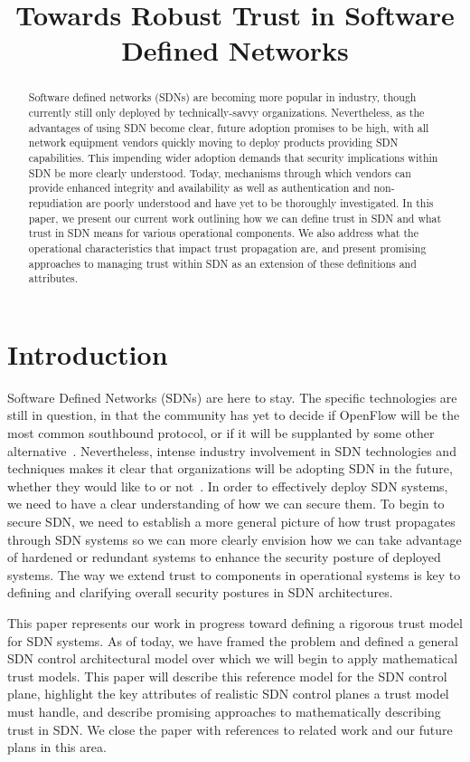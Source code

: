 \documentclass[10pt,conference]{IEEEtran}
\title{Towards Robust Trust in Software Defined Networks}
\begin{document}
\maketitle

\begin{abstract}
Software defined networks (SDNs) are becoming more popular in industry, though currently still only deployed by technically-savvy organizations.  Nevertheless, as the advantages of using SDN become clear, future adoption promises to be high, with all network equipment vendors quickly moving to deploy products providing SDN capabilities.  This impending wider adoption demands that security implications within SDN be more clearly understood.  Today, mechanisms through which vendors can provide enhanced integrity and availability as well as authentication and non-repudiation are poorly understood and have yet to be thoroughly investigated.  In this paper, we present our current work outlining how we can define trust in SDN and what trust in SDN means for various operational components.  We also address what the operational characteristics that impact trust propagation are, and present promising approaches to managing trust within SDN as an extension of these definitions and attributes.
\end{abstract}

\section{Introduction}
Software Defined Networks (SDNs) are here to stay. The specific technologies are still in question, in that the community has yet to decide if OpenFlow will be the most common southbound protocol, or if it will be supplanted by some other alternative~\cite{rfc6241}.  Nevertheless, intense industry involvement in SDN technologies and techniques makes it clear that organizations will be adopting SDN in the future, whether they would like to or not~\cite{opendaylight}.  In order to effectively deploy SDN systems, we need to have a clear understanding of how we can secure them.  To begin to secure SDN, we need to establish a more general picture of how trust propagates through SDN systems so we can more clearly envision how we can take advantage of hardened or redundant systems to enhance the security posture of deployed systems.  The way we extend trust to components in operational systems is key to defining and clarifying overall security postures in SDN architectures.

This paper represents our work in progress toward defining a rigorous trust model for SDN systems.  As of today, we have framed the problem and defined a general SDN control architectural model over which we will begin to apply mathematical trust models.  This paper will describe this reference model for the SDN control plane, highlight the key attributes of realistic SDN control planes a trust model must handle, and describe promising approaches to mathematically describing trust in SDN.  We close the paper with references to related work and our future plans in this area.
\end{document}
